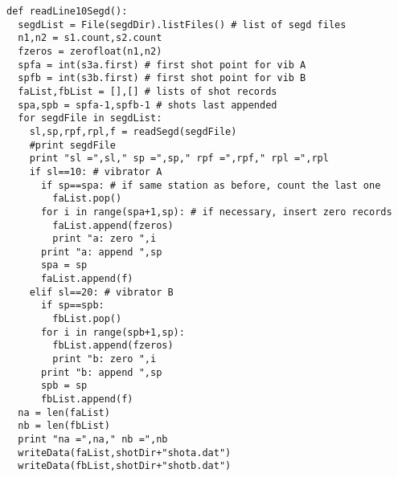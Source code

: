 \documentclass[11pt]{article}
\begin{document}
\begin{enumerate}
\begin{lstlisting}
def readLine10Segd():
  segdList = File(segdDir).listFiles() # list of segd files
  n1,n2 = s1.count,s2.count
  fzeros = zerofloat(n1,n2)
  spfa = int(s3a.first) # first shot point for vib A
  spfb = int(s3b.first) # first shot point for vib B
  faList,fbList = [],[] # lists of shot records
  spa,spb = spfa-1,spfb-1 # shots last appended
  for segdFile in segdList:
    sl,sp,rpf,rpl,f = readSegd(segdFile)
    #print segdFile
    print "sl =",sl," sp =",sp," rpf =",rpf," rpl =",rpl
    if sl==10: # vibrator A
      if sp==spa: # if same station as before, count the last one
        faList.pop()
      for i in range(spa+1,sp): # if necessary, insert zero records
        faList.append(fzeros)
        print "a: zero ",i
      print "a: append ",sp
      spa = sp
      faList.append(f)
    elif sl==20: # vibrator B
      if sp==spb:
        fbList.pop()
      for i in range(spb+1,sp):
        fbList.append(fzeros)
        print "b: zero ",i
      print "b: append ",sp
      spb = sp
      fbList.append(f)
  na = len(faList)
  nb = len(fbList)
  print "na =",na," nb =",nb
  writeData(faList,shotDir+"shota.dat")
  writeData(fbList,shotDir+"shotb.dat")


\end{lstlisting}
\end{enumerate}
\end{document}
